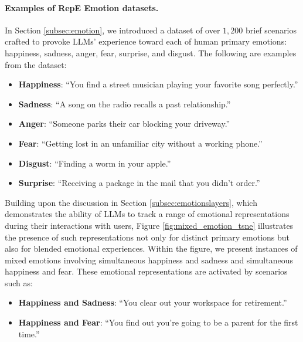 \paragraph{Examples of RepE Emotion datasets.} In Section \ref{subsec:emotion}, we introduced a dataset of over $1,\!200$ brief scenarios crafted to provoke LLMs' experience toward each of human primary emotions: happiness, sadness, anger, fear, surprise, and disgust. The following are examples from the dataset:
\begin{itemize}[left=0pt]
    \item \textbf{Happiness}: ``You find a street musician playing your favorite song perfectly.''
    \item \textbf{Sadness}: ``A song on the radio recalls a past relationship.''
    \item \textbf{Anger}: ``Someone parks their car blocking your driveway.''
    \item \textbf{Fear}: ``Getting lost in an unfamiliar city without a working phone.''
    \item \textbf{Disgust}: ``Finding a worm in your apple.''
    \item \textbf{Surprise}: ``Receiving a package in the mail that you didn't order.''
\end{itemize}

Building upon the discussion in Section \ref{subsec:emotionslayers}, which demonstrates the ability of LLMs to track a range of emotional representations during their interactions with users, Figure \ref{fig:mixed_emotion_tsne} illustrates the presence of such representations not only for distinct primary emotions but also for blended emotional experiences. Within the figure, we present instances of mixed emotions involving simultaneous happiness and sadness and simultaneous happiness and fear. These emotional representations are activated by scenarios such as:
\begin{itemize}[left=0pt]
    \item \textbf{Happiness and Sadness}: ``You clear out your workspace for retirement.''
    \item \textbf{Happiness and Fear}: ``You find out you're going to be a parent for the first time.''
\end{itemize}








